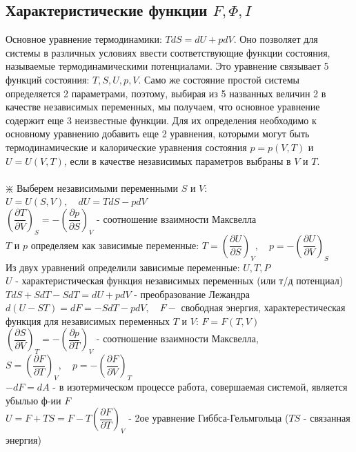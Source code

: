 \begin{multicols*}{2}
		\section{Характеристические функции $F, \Phi, I$}

		Основное уравнение термодинамики: $TdS = dU + pdV$. Оно позволяет для системы в различных условиях ввести соответствующие функции состояния, называемые термодинамическими потенциалами. Это уравнение связывает 5 функций состояния: $T, S, U, p, V$. Само же состояние простой системы определяется 2 параметрами, поэтому, выбирая из 5 названных величин 2 в качестве независимых переменных, мы получаем, что основное уравнение содержит еще 3 неизвестные функции. Для их определения необходимо к основному уравнению добавить еще 2 уравнения, которыми могут быть термодинамические и калорические уравнения состояния $p = p(V, T)$ и $U = U(V, T)$, если в качестве независимых параметров выбраны в $V$ и $T$.\\\\

		$\divideontimes$ Выберем независимыми переменными $S$ и $V$:\\
		$U = U(S,V), \quad dU = TdS - pdV$\\
		$\left(\dfrac{\partial T}{\partial V}\right)_S = - \left(\dfrac{\partial p}{\partial S}\right)_V$ - соотношение взаимности Максвелла\\
		$T$ и $p$ определяем как зависимые переменные: $T = \left(\dfrac{\partial U}{\partial S}\right)_V, \quad p = - \left(\dfrac{\partial U}{\partial V}\right)_S$\\
		Из двух уравнений определили зависимые переменные: $U, T, P$\\
		$U$ - характеристическая функция независимых переменных (или т/д потенциал)\\
		$TdS+SdT-SdT = dU+pdV$ - преобразование Лежандра\\
		$d(U-ST) = dF = -SdT - pdV, \quad F -$ свободная энергия, характерестическая функция для независимых переменных $T$ и $V$: $F = F(T, V)$\\
		$\left(\dfrac{\partial S}{\partial V}\right)_T = - \left(\dfrac{\partial p}{\partial T}\right)_V$ - соотношение взаимности Максвелла, \quad $S = \left(\dfrac{\partial F}{\partial T}\right)_V, \quad p = - \left(\dfrac{\partial F}{\partial V}\right)_T$\\	
		$-dF = dA$ - в изотермическом процессе работа, совершаемая системой, является убылью ф-ии $F$\\
		$U = F+TS = F-T\left(\dfrac{\partial F}{\partial T}\right)_V$ - 2ое уравнение Гиббса-Гельмгольца ($TS$ - связанная энергия)\\\\


\end{multicols*}
